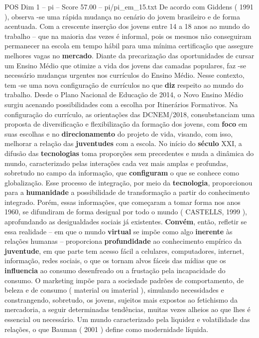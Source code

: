 \begin{textsample}{POS Dim 1 – pi – Score 57.00 – pi/pi\_em\_15.txt}
De acordo com Giddens ( 1991 ), observa -se uma rápida mudança no cenário do jovem brasileiro e de forma acentuada.
Com a crescente inserção dos jovens entre 14 a 18 anos ao mundo do trabalho – que na maioria das vezes é informal, pois os mesmos não conseguiram permanecer na escola em tempo hábil para uma mínima certificação que assegure melhores vagas no \textbf{mercado}.
Diante da precarização das oportunidades de cursar um Ensino Médio que otimize a vida dos jovens das camadas populares, faz -se necessário mudanças urgentes nos currículos do Ensino Médio.
Nesse contexto, tem -se uma nova configuração de currículos no que \textbf{diz} respeito ao mundo do trabalho.
Desde o Plano Nacional de Educação de 2014, o Novo Ensino Médio surgiu acenando possibilidades com a escolha por Itinerários Formativos.
Na configuração do currículo, as orientações das DCNEM/2018, consubstanciam uma proposta de diversificação e flexibilização da formação dos jovens, com \textbf{foco} em suas escolhas e no \textbf{direcionamento} do projeto de vida, visando, com isso, melhorar a relação das \textbf{juventudes} com a escola.
No início do \textbf{século} XXI, a difusão das \textbf{tecnologias} toma proporções sem precedentes e muda a dinâmica do mundo, caracterizado pelas interações cada vez mais amplas e profundas, sobretudo no campo da informação, que \textbf{configuram} o que se conhece como globalização.
Esse processo de integração, por meio da \textbf{tecnologia}, proporcionou para a \textbf{humanidade} a possibilidade de transformação a partir do conhecimento integrado.
Porém, essas informações, que começaram a tomar forma nos anos 1960, se difundiram de forma desigual por todo o mundo ( CASTELLS, 1999 ), aprofundando as desigualdades sociais já existentes. \textbf{Convém}, então, refletir se essa realidade – em que o mundo \textbf{virtual} se impõe como algo \textbf{inerente} às relações humanas – proporciona \textbf{profundidade} ao conhecimento empírico da \textbf{juventude}, em que parte tem acesso fácil a celulares, computadores, internet, informação, redes sociais, o que os tornam alvos fáceis das mídias que os \textbf{influencia} ao consumo desenfreado ou a frustação pela incapacidade do consumo.
O marketing impõe para a sociedade padrões de comportamento, de beleza e de consumo ( material ou imaterial ), simulando necessidades e constrangendo, sobretudo, os jovens, sujeitos mais expostos ao fetichismo da mercadoria, a seguir determinadas tendências, muitas vezes alheios ao que lhes é essencial ou necessário.
Um mundo caracterizado pela liquidez e volatilidade das relações, o que Bauman ( 2001 ) define como modernidade líquida.

\end{textsample}
